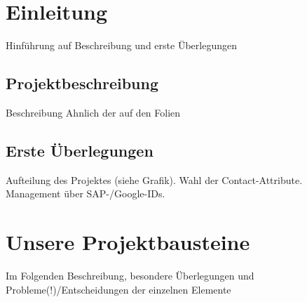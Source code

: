 \section{Einleitung}
Hinführung auf Beschreibung und erste Überlegungen

\subsection{Projektbeschreibung}
Beschreibung Ahnlich der auf den Folien

\subsection{Erste Überlegungen}
Aufteilung des Projektes (siehe Grafik). Wahl der Contact-Attribute. Management über SAP-/Google-IDs.



\section{Unsere Projektbausteine}
Im Folgenden Beschreibung, besondere Überlegungen und Probleme(!)/Entscheidungen der einzelnen Elemente

